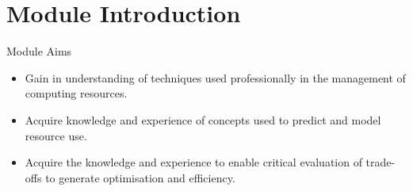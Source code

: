 \part{Module Introduction}
\frame{\partpage}

\begin{frame}{Module Aims}
	\begin{itemize}
		\item Gain in understanding of techniques used professionally in the management of computing resources.
		\item Acquire knowledge and experience of concepts used to predict and model resource use.
		\item Acquire the knowledge and experience to enable critical evaluation of trade-offs to generate optimisation and efficiency.
	\end{itemize}
\end{frame}